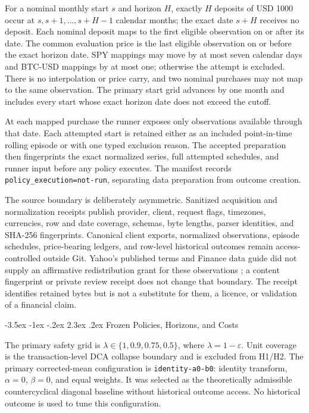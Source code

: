 \documentclass[12pt,a4paper,oneside]{report}
\makeatletter
\renewcommand\section{\@startsection{section}{1}{\z@}%
  {-3.5ex \@plus -1ex \@minus -.2ex}%
  {2.3ex \@plus .2ex}%
  {\normalfont\fontsize{14}{17}\selectfont\bfseries}}
\makeatother
\begin{document}
For a nominal monthly start $s$ and horizon $H$, exactly $H$ deposits of USD
1000 occur at $s,s+1,\ldots,s+H-1$ calendar months; the exact date $s+H$
receives no deposit. Each nominal deposit maps to the first eligible
observation on or after its date. The common evaluation price is the last
eligible observation on or before the exact horizon date. SPY mappings may
move by at most seven calendar days and BTC-USD mappings by at most one;
otherwise the attempt is excluded. There is no interpolation or price carry,
and two nominal purchases may not map to the same observation. The primary
start grid advances by one month and includes every start whose exact horizon
date does not exceed the cutoff.

At each mapped purchase the runner exposes only observations available through
that date. Each attempted start is retained either as an included point-in-time
rolling episode or with one typed exclusion reason. The accepted preparation
then fingerprints the exact normalized series, full attempted schedules, and
runner input before any policy executes. The manifest records
\texttt{policy\_execution=not-run}, separating data preparation from outcome
creation.

The source boundary is deliberately asymmetric. Sanitized acquisition and
normalization receipts publish provider, client, request flags, timezones,
currencies, row and date coverage, schemas, byte lengths, parser identities,
and SHA-256 fingerprints. Canonical client exports, normalized observations,
episode schedules, price-bearing ledgers, and row-level historical outcomes
remain access-controlled outside Git. Yahoo's published terms and Finance data
guide did not supply an affirmative redistribution grant for these observations
\citep{yahoo2026terms,yahoo2026providers}; a content fingerprint or private
review receipt does not change that boundary. The receipt identifies retained
bytes but is not a substitute for them, a licence, or validation of a financial
claim.

\section{Frozen Policies, Horizons, and Costs}
\label{sec:method-frozen-grid}

The primary safety grid is
$\lambda\in\{1,0.9,0.75,0.5\}$, where
$\lambda=1-\varepsilon$. Unit coverage is the transaction-level DCA collapse
boundary and is excluded from H1/H2. The primary corrected-mean configuration
is \texttt{identity-a0-b0}: identity transform, $\alpha=0$, $\beta=0$, and
equal weights. It was selected as the theoretically admissible
countercyclical diagonal baseline without historical outcome access. No
historical outcome is used to tune this configuration.
\end{document}
